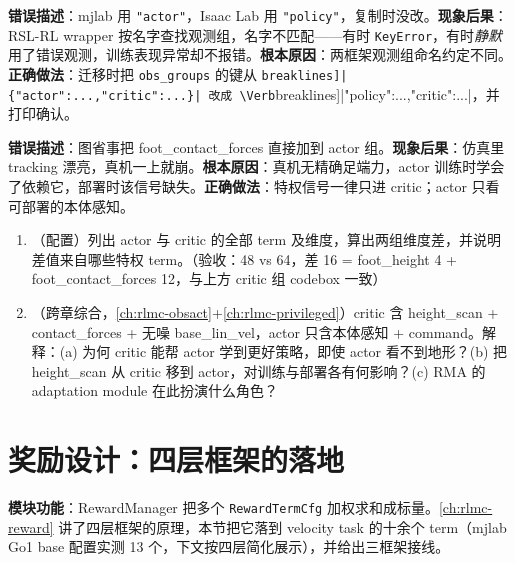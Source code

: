 \begin{pitfall}
\textbf{错误描述}：mjlab 用 \verb|"actor"|，Isaac Lab 用 \verb|"policy"|，复制时没改。\textbf{现象后果}：RSL-RL wrapper 按名字查找观测组，名字不匹配——有时 \verb|KeyError|，有时\emph{静默}用了错误观测，训练表现异常却不报错。\textbf{根本原因}：两框架观测组命名约定不同。\textbf{正确做法}：迁移时把 \verb|obs_groups| 的键从 \Verb[breaklines]|{"actor":...,"critic":...}| 改成 \Verb[breaklines]|{"policy":...,"critic":...}|，并打印确认。
\end{pitfall}

\begin{pitfall}
\textbf{错误描述}：图省事把 foot\_contact\_forces 直接加到 actor 组。\textbf{现象后果}：仿真里 tracking 漂亮，真机一上就崩。\textbf{根本原因}：真机无精确足端力，actor 训练时学会了依赖它，部署时该信号缺失。\textbf{正确做法}：特权信号一律只进 critic；actor 只看可部署的本体感知。
\end{pitfall}

\begin{practice}[观测设计]
\begin{enumerate}
\item （配置）列出 actor 与 critic 的全部 term 及维度，算出两组维度差，并说明差值来自哪些特权 term。（验收：48 vs 64，差 16 = foot\_height 4 + foot\_contact\_forces 12，与上方 critic 组 codebox 一致）
\item （跨章综合，\cref{ch:rlmc-obsact}+\cref{ch:rlmc-privileged}）critic 含 height\_scan + contact\_forces + 无噪 base\_lin\_vel，actor 只含本体感知 + command。解释：(a) 为何 critic 能帮 actor 学到更好策略，即使 actor 看不到地形？(b) 把 height\_scan 从 critic 移到 actor，对训练与部署各有何影响？(c) RMA 的 adaptation module 在此扮演什么角色？
\end{enumerate}
\end{practice}

\section{奖励设计：四层框架的落地}
\label{sec:rlmc-ql-reward}

\textbf{模块功能}：RewardManager 把多个 \verb|RewardTermCfg| 加权求和成标量。\cref{ch:rlmc-reward} 讲了四层框架的原理，本节把它落到 velocity task 的十余个 term（mjlab Go1 base 配置实测 13 个，下文按四层简化展示），并给出三框架接线。

